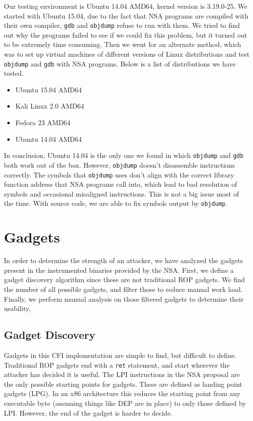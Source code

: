 \documentclass[conference,compsoc]{IEEEtran}
\begin{document}
Our testing environment is Ubuntu 14.04 AMD64, kernel version is 3.19.0-25. We started with Ubuntu 15.04, due to the fact that NSA programs are compiled with their own compiler, \texttt{gdb} and \texttt{objdump} refuse to run with them. We tried to find out why the programs failed to see if we could fix this problem, but it turned out to be extremely time consuming. Then we went for an alternate method, which was to set up virtual machines of different versions of Linux distributions and test \texttt{objdump} and \texttt{gdb} with NSA programs. Below is a list of distributions we have tested.
\begin{itemize}
  \item Ubuntu 15.04 AMD64
  \item Kali Linux 2.0 AMD64
  \item Fedora 23 AMD64
  \item Ubuntu 14.04 AMD64
\end{itemize}	
In conclusion, Ubuntu 14.04 is the only one we found in which \texttt{objdump} and \texttt{gdb} both work out of the box. However, \texttt{objdump} doesn't disassemble instructions correctly. The symbols that \texttt{objdump} uses don't align with the correct library function address that NSA programs call into, which lead to bad resolution of symbols and occasional misaligned instructions. This is not a big issue most of the time. With source code, we are able to fix symbols output by \texttt{objdump}.


\section{Gadgets} \label{sec:gadgets}

In order to determine the strength of an attacker, we have analyzed the gadgets present in the instrumented binaries provided by the NSA\cite{NSAGitHub}. First, we define a gadget discovery algorithm since these are not traditional ROP gadgets. We find the number of all possible gadgets, and filter those to reduce manual work load. Finally, we perform manual analysis on those filtered gadgets to determine their usability.


\subsection{Gadget Discovery} \label{sec:gdiscovery}

Gadgets in this CFI implementation are simple to find, but difficult to define. Traditional ROP gadgets end with a \texttt{ret} statement, and start wherever the attacker has decided it is useful. The LPI instructions in the NSA proposal are the only possible starting points for gadgets\cite{NSAGitHub}. These are defined as landing point gadgets (LPG). In an x86 architecture this reduces the starting point from any executable byte (assuming things like DEP are in place) to only those defined by LPI. However, the end of the gadget is harder to decide.
\end{document}
